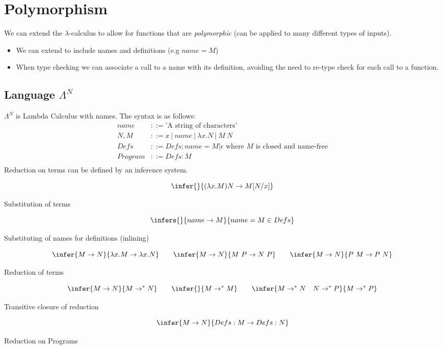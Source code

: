 \chapter{Polymorphism}
We can extend the $\lambda$-calculus to allow for functions that are \textit{polymorphic} (can be applied to many different types of inputs).
\begin{itemize}
    \item We can extend to include names and definitions (e.g $name = M$)
    \item When type checking we can associate a call to a name with its definition, avoiding the need to re-type check for each call to a function.
\end{itemize}

\section{Language $\Lambda^N$}
$\Lambda^N$ is Lambda Calculus with names. The syntax is as follows:
\[\begin{split}
    name & ::= \text{'A string of characters'} \\
    N, M & ::= x \ | \ name \ | \ \lambda x. N \ | \ M \ N \\
    Defs & ::= Defs ; name = M | \epsilon \text{ where } M \text{ is closed and name-free}\\ 
    Program & ::= Defs : M \\
\end{split}\]
Reduction on terms can be defined by an inference system.
\\ \begin{minipage}{.48\textwidth}
    \[\infer{}{(\lambda x. M) N \to M[N/x]}\]
    \centerline{Substitution of terms}
\end{minipage}
\hfill
\begin{minipage}{.48\textwidth}
    \[\infers{}{name \to M}{name = M \in Defs}\]
    \centerline{Substituting of names for definitions (inlining)}
\end{minipage}
\vspace{2mm}
\[\infer{M \to N}{\lambda x . M \to \lambda x . N} 
\qquad \infer{M \to N}{M \ P \to N \ P}
\qquad \infer{M \to N}{P \ M \to P \ N}\]
\centerline{Reduction of terms}

\[\infer{M \to N}{M \to^* N}
\qquad \infer{}{M \to^* M}
\qquad \infer{M \to^* N \quad N \to^* P}{M \to^* P}\]
\centerline{Transitive closure of reduction}

\[\infer{M \to N}{Defs : M \to Defs : N}\]
\centerline{Reduction on Programs}

